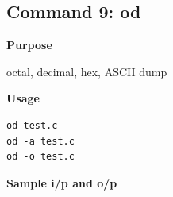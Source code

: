\subsection{Command 9: od} 
\textbf{Purpose}
\begin{flushleft}
 octal, decimal, hex, ASCII dump
\end{flushleft}
\textbf{Usage}
\begin{verbatim}
od test.c
od -a test.c
od -o test.c
\end{verbatim}
\textbf{Sample i/p and o/p}
\begin{figure}[H] 
\end{figure}
